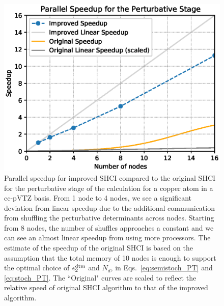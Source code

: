 \documentclass[%
reprint,
 superscriptaddress,
 amsmath,amssymb,
 aps,
]{revtex4-1}
\begin{document}
\begin{figure}[h]
  \includegraphics[width=\linewidth]{scalability/dtm.eps}
  \caption{
Parallel speedup for improved SHCI compared to the original SHCI for the perturbative stage of the
calculation for a copper atom in a cc-pVTZ basis.
From 1 node to 4 nodes, we see a significant deviation from linear speedup due to the additional communication from shuffling the perturbative determinants across nodes.
Starting from 8 nodes, the number of shuffles approaches a constant and we can see an almost linear speedup from using more processors.
The estimate of the speedup of the original SHCI is based on the assumption that the total memory of 10 nodes is enough to support
the optimal choice of $\epsilon_2^{\rm dtm}$ and $N_d$, in Eqs.~\ref{eq:semistoch_PT} and \ref{eq:stoch_PT}.
The ``Original" curves are scaled to reflect the relative speed of original SHCI algorithm to that of the improved algorithm.
}
  \label{fig:parapt}
\end{figure}

\end{document}
